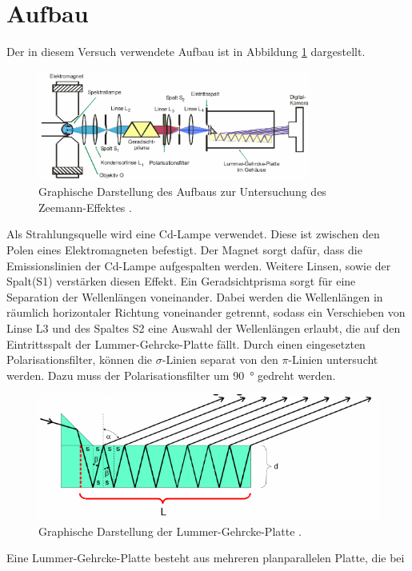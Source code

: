 \newpage
\section{Aufbau}
\label{sec:Aufbau}
Der in diesem Versuch verwendete Aufbau ist in Abbildung \ref{abb:aufbau} dargestellt.
\begin{figure}[htb]
  \centering
  \includegraphics[width=0.8\textwidth]{images/V27_7.pdf}
  \caption{Graphische Darstellung des Aufbaus zur Untersuchung des Zeemann-Effektes \cite{anleitung}.}
  \label{abb:aufbau}
\end{figure}
Als Strahlungsquelle wird eine Cd-Lampe verwendet. Diese ist zwischen den Polen
eines Elektromagneten befestigt. Der Magnet sorgt dafür, dass die Emissionslinien
der Cd-Lampe aufgespalten werden. Weitere Linsen, sowie der Spalt(S1) verstärken
diesen Effekt. Ein
Geradsichtprisma sorgt für eine Separation der Wellenlängen voneinander. Dabei
werden die Wellenlängen in räumlich horizontaler Richtung voneinander getrennt,
sodass ein Verschieben von Linse L3 und des Spaltes S2 eine Auswahl der Wellenlängen
erlaubt, die auf den Eintrittsspalt der Lummer-Gehrcke-Platte fällt. Durch einen
eingesetzten Polarisationsfilter, können die $\sigma$-Linien separat von den
$\pi$-Linien untersucht werden. Dazu muss der Polarisationsfilter um \SI{90}{\degree}
gedreht werden.
\begin{figure}[htb]
  \centering
  \includegraphics{images/V27_6.pdf}
  \caption{Graphische Darstellung der Lummer-Gehrcke-Platte \cite{anleitung}.}
  \label{abb:lummer}
\end{figure}
Eine Lummer-Gehrcke-Platte besteht aus mehreren planparallelen Platte, die bei
